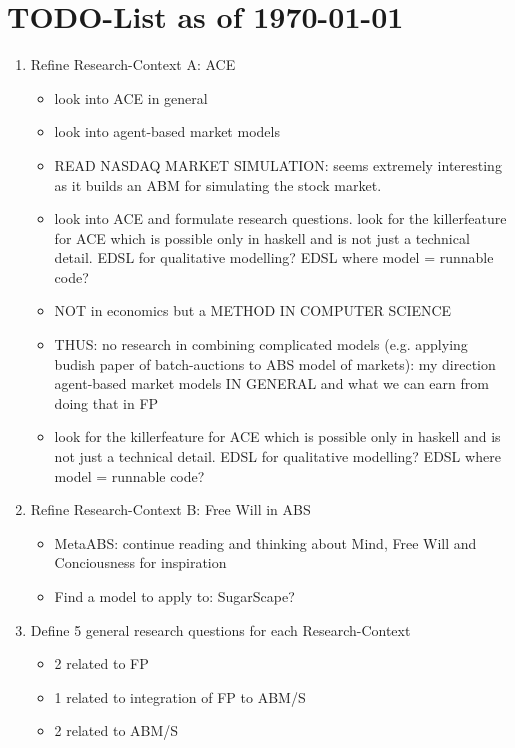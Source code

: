 \section{TODO-List as of \today}

\begin{enumerate}
  
\item Refine Research-Context A: ACE
	\begin{itemize}
    \item look into ACE in general
    \item look into agent-based market models
	\item READ NASDAQ MARKET SIMULATION: seems extremely interesting as it builds an ABM for simulating the stock market.
	\item look into ACE and formulate research questions. look for the killerfeature for ACE which is possible only in haskell and is not just a technical detail. EDSL for qualitative modelling? EDSL where model = runnable code?
	\item  NOT in economics but a METHOD IN COMPUTER SCIENCE
	\item THUS: no research in combining complicated models (e.g. applying budish paper of batch-auctions to ABS model of markets): my direction agent-based market models IN GENERAL and what we can earn from doing that in FP
	\item look for the killerfeature for ACE which is possible only in haskell and is not just a technical detail. EDSL for qualitative modelling? EDSL where model = runnable code?
	\end{itemize}
	 
\item Refine Research-Context B: Free Will in ABS
	\begin{itemize}
	\item MetaABS: continue reading and thinking about Mind, Free Will and Conciousness for inspiration
	\item Find a model to apply to: SugarScape?
	\end{itemize}

\item Define 5 general research questions for each Research-Context
	\begin{itemize}
    \item 2 related to FP
    \item 1 related to integration of FP to ABM/S
    \item 2 related to ABM/S
    \end{itemize}


\end{enumerate}
